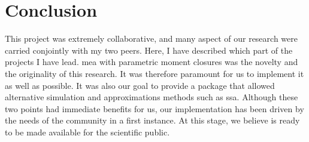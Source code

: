 \section{Conclusion}
This project was extremely collaborative, and many aspect of our research were carried conjointly with my two peers.
Here, I have described which part of the projects I have lead.
\gls{mea} with parametric moment closures was the novelty and the originality of this research.
It was therefore paramount for us to implement it as well as possible.
It was also our goal to provide a package that allowed alternative simulation and approximations methods such as \gls{ssa}.
Although these two points had immediate benefits for us, our implementation has been driven by the needs of the community in a first instance.
At this stage, we believe \means{} is ready to be made available for the scientific public.

